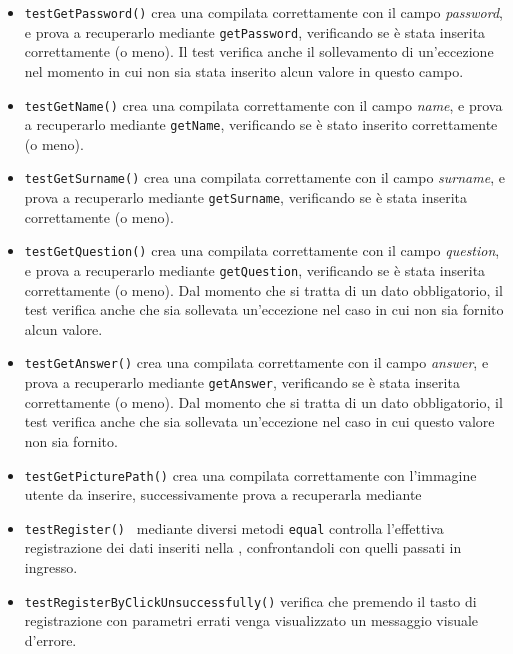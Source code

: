 \begin{itemize}
\begin{itemize}
\item \texttt{testGetPassword()} crea una  compilata correttamente con il campo \textit{password}, e prova a recuperarlo mediante \texttt{getPassword}, verificando se è stata inserita correttamente (o meno). Il test verifica anche il sollevamento di un'eccezione nel momento in cui non sia stata inserito alcun valore in questo campo.

\item \texttt{testGetName()}  crea una  compilata correttamente con il campo \textit{name}, e prova a recuperarlo mediante \texttt{getName}, verificando se è stato inserito correttamente (o meno).

\item \texttt{testGetSurname()}  crea una  compilata correttamente con il campo \textit{surname}, e prova a recuperarlo mediante \texttt{getSurname}, verificando se è stata inserita correttamente (o meno).

\item \texttt{testGetQuestion()}  crea una  compilata correttamente con il campo \textit{question}, e prova a recuperarlo mediante \texttt{getQuestion}, verificando se è stata inserita correttamente (o meno). Dal momento che si tratta di un dato obbligatorio, il test verifica anche che sia sollevata un'eccezione nel caso in cui non sia fornito alcun valore.

\item \texttt{testGetAnswer()} crea una  compilata correttamente con il campo \textit{answer}, e prova a recuperarlo mediante \texttt{getAnswer}, verificando se è stata inserita correttamente (o meno). Dal momento che si tratta di un dato obbligatorio, il test verifica anche che sia sollevata un'eccezione nel caso in cui questo valore non sia fornito.

\item \texttt{testGetPicturePath()} crea una  compilata correttamente con l'immagine utente da inserire, successivamente prova a recuperarla mediante 

\item \texttt{testRegister() } mediante diversi metodi \texttt{equal} controlla l'effettiva registrazione dei dati inseriti nella , confrontandoli con quelli passati in ingresso.

\item \texttt{testRegisterByClickUnsuccessfully()} verifica che premendo il tasto di registrazione con parametri errati venga visualizzato un messaggio visuale d'errore.


\end{itemize}
\end{itemize}
